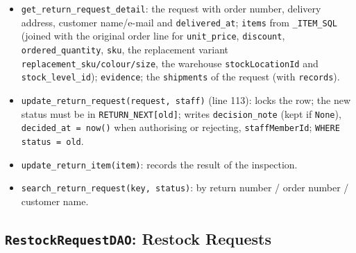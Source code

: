 \begin{itemize}
\tightlist
\item
  \texttt{get\_\allowbreak{}return\_\allowbreak{}request\_\allowbreak{}detail}: the request with order number,
  delivery address, customer name/e-mail and \texttt{delivered\_\allowbreak{}at};
  \texttt{items} from \texttt{\_\allowbreak{}ITEM\_\allowbreak{}SQL} (joined with the original
  order line for \texttt{unit\_\allowbreak{}price}, \texttt{discount},
  \texttt{ordered\_\allowbreak{}quantity}, \texttt{sku}, the replacement variant
  \texttt{replacement\_\allowbreak{}sku/\allowbreak{}colour/\allowbreak{}size}, the warehouse
  \texttt{stockLocationId} and \texttt{stock\_\allowbreak{}level\_\allowbreak{}id});
  \texttt{evidence}; the \texttt{shipments} of the request (with
  \texttt{records}).
\item
  \texttt{update\_\allowbreak{}return\_\allowbreak{}request(\allowbreak{}request,\allowbreak{} staff)} (line 113): locks
  the row; the new status must be in \texttt{RETURN\_\allowbreak{}NEXT{[}old{]}};
  writes \texttt{decision\_\allowbreak{}note} (kept if \texttt{None}),
  \texttt{decided\_\allowbreak{}at =\allowbreak{} now(\allowbreak{})} when authorising or rejecting,
  \texttt{staffMemberId}; \texttt{WHERE status =\allowbreak{} old}.
\item
  \texttt{update\_\allowbreak{}return\_\allowbreak{}item(\allowbreak{}item)}: records the result of the
  inspection.
\item
  \texttt{search\_\allowbreak{}return\_\allowbreak{}request(\allowbreak{}key,\allowbreak{} status)}: by return number /
  order number / customer name.
\end{itemize}

\hypertarget{restockrequestdao-restock-requests}{%
\subsection{\texorpdfstring{\texttt{RestockRequestDAO}: Restock
Requests}{RestockRequestDAO: Restock Requests}}\label{restockrequestdao-restock-requests}}

